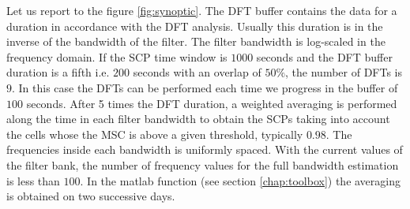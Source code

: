 Let us report to the figure \ref{fig:synoptic}. The DFT buffer contains the data for a duration in accordance with the DFT analysis. Usually this duration is in the inverse of the bandwidth of the filter. The filter bandwidth is log-scaled in the frequency domain. If the SCP time window is $1000$ seconds and the DFT buffer duration is  a fifth i.e. $200$ seconds with an overlap of $50\%$, the number of DFTs  is $9$. In this case the DFTs can be performed each time we progress in the buffer of $100$ seconds. After 5 times the DFT duration, a weighted averaging is performed along the time in each filter bandwidth to obtain the SCPs taking into account the cells whose the MSC is above a given threshold, typically $0.98$. The frequencies inside each bandwidth is uniformly spaced. With the current values of the filter bank, the number of frequency values for the full bandwidth estimation is less than $100$. In the matlab function (see section \ref{chap:toolbox}) the averaging is obtained on two successive days.

